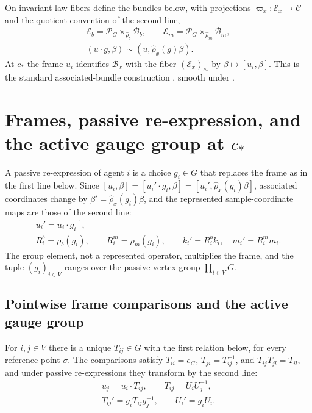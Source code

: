 On invariant law fibers define the bundles below, with projections $\varpi_x:\mathcal E_x\to\mathcal C$
and the quotient convention of the second line,
\begin{gather}
\mathcal E_b=\mathscr P_G\times_{\widehat\rho_b}\mathcal B_b,
\qquad
\mathcal E_m=\mathscr P_G\times_{\widehat\rho_m}\mathcal B_m,
\label{eq:geo-associated-bundles}\\
(u\cdot g,\beta)\sim(u,\widehat\rho_x(g)\beta).
\label{eq:geo-quotient-convention}
\end{gather}
At $c_*$ the frame $u_i$ identifies $\mathcal B_x$ with the fiber $(\mathcal E_x)_{c_*}$ by
$\beta\mapsto[u_i,\beta]$. This is the standard associated-bundle construction
\citep[Section~I.5]{Kobayashi1963}, smooth under .

\section{Frames, passive re-expression, and the active gauge group at \texorpdfstring{$c_*$}{c*}}
\label{sec:geo-frame-gauge}

A passive re-expression of agent $i$ is a choice $g_i\in G$ that replaces the frame as in the first
line below. Since $[u_i,\beta]=[u_i'\cdot g_i,\beta]=[u_i',\widehat\rho_x(g_i)\beta]$, associated
coordinates change by $\beta'=\widehat\rho_x(g_i)\beta$, and the represented sample-coordinate maps are
those of the second line:
\begin{gather}
u_i'=u_i\cdot g_i^{-1},
\label{eq:geo-local-reframing}\\
R_i^b=\rho_b(g_i),
\qquad
R_i^m=\rho_m(g_i),
\qquad
k_i'=R_i^bk_i,\quad m_i'=R_i^mm_i.
\label{eq:geo-represented-frame-change}
\end{gather}
The group element, not a represented operator, multiplies the frame, and the tuple $(g_i)_{i\in V}$
ranges over the passive vertex group $\prod_{i\in V}G$.

\subsection{Pointwise frame comparisons and the active gauge group}
\label{sec:geo-regime-one}

For $i,j\in V$ there is a unique $T_{ij}\in G$ with the first relation below, for every reference
point $\sigma$. The comparisons satisfy $T_{ii}=e_G$, $T_{ji}=T_{ij}^{-1}$, and $T_{ij}T_{jl}=T_{il}$,
and under passive re-expressions they transform by the second line:
\begin{gather}
u_j=u_i\cdot T_{ij},
\qquad
T_{ij}=U_iU_j^{-1},
\label{eq:geo-frame-comparison}\\
T_{ij}'=g_iT_{ij}g_j^{-1},
\qquad
U_i'=g_iU_i.
\label{eq:geo-regime-one-gauge-law}
\end{gather}

